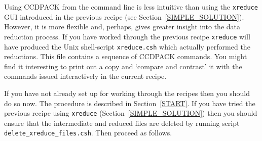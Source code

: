 \documentclass[twoside,11pt]{article}
\begin{document}
Using CCDPACK from the command line is less intuitive than using the
{\tt xreduce} GUI introduced in the previous recipe (see
Section~\ref{SIMPLE_SOLUTION}).  However, it is more flexible and,
perhaps, gives greater insight into the data reduction process.  If you
have worked through the previous recipe {\tt xreduce} will have produced
the Unix shell-script {\tt xreduce.csh} which actually performed the
reductions.  This file contains a sequence of CCDPACK commands.  You
might find it interesting to print out a copy and `compare and contrast'
it with the commands issued interactively in the current recipe.

If you have not already set up for working through the recipes then
you should do so now.  The procedure is described in Section~\ref{START}.
If you have tried the previous recipe using {\tt xreduce}
(Section~\ref{SIMPLE_SOLUTION}) then you should ensure that the
intermediate and reduced files are deleted by running script {\tt
delete\_xreduce\_files.csh}.  Then proceed as follows.
\end{document}
